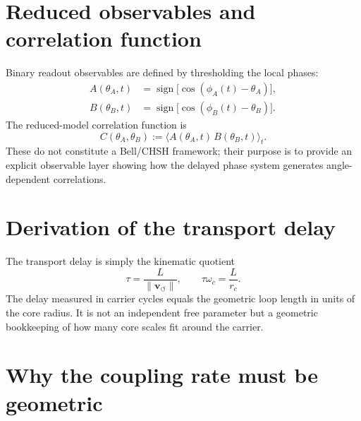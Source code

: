 \documentclass[11pt]{article}
\newcommand{\vnorm}{\lVert \mathbf{v}_{\!\boldsymbol{\circlearrowleft}}\rVert}
\newcommand{\rc}{r_c}
\begin{document}
\section{Reduced observables and correlation function}

Binary readout observables are defined by thresholding the local phases:
\begin{align}
    A(\theta_A,t) &= \operatorname{sign}\!\big[\cos(\phi_A(t)-\theta_A)\big], \label{eq:Aobs}\\
    B(\theta_B,t) &= \operatorname{sign}\!\big[\cos(\phi_B(t)-\theta_B)\big]. \label{eq:Bobs}
\end{align}
The reduced-model correlation function is
\begin{equation}
    C(\theta_A,\theta_B) := \langle A(\theta_A,t)\,B(\theta_B,t)\rangle_t. \label{eq:Cobs}
\end{equation}
These do not constitute a Bell/CHSH framework; their purpose is to provide an explicit observable layer showing how the delayed phase system generates angle-dependent correlations.

\section{Derivation of the transport delay}

The transport delay is simply the kinematic quotient
\begin{equation}
    \tau = \frac{L}{\vnorm}, \qquad \tau\omega_c = \frac{L}{\rc}.
    \label{eq:tau}
\end{equation}
The delay measured in carrier cycles equals the geometric loop length in units of the core radius. It is not an independent free parameter but a geometric bookkeeping of how many core scales fit around the carrier.

\section{Why the coupling rate must be geometric}
\end{document}

